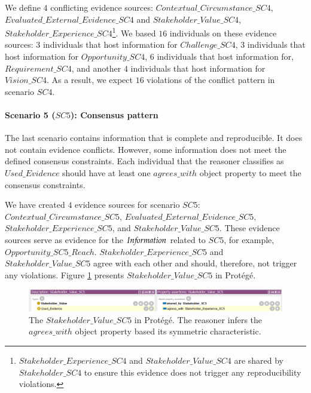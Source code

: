 We define $4$ conflicting evidence sources: $Contextual\_Circumstance\_SC4$, $Evaluated\_External\_Evidence\_SC4$ and $Stakeholder\_Value\_SC4$, $Stakeholder\_Experience\_SC4$\footnote{$Stakeholder\_Experience\_SC4$ and $Stakeholder\_Value\_SC4$ are shared by $Stakeholder\_SC4$ to ensure this evidence does not trigger any reproducibility violations.}. We based $16$ individuals on these evidence sources: $3$ individuals that host information for $Challenge\_SC4$, $3$ individuals that host information for $Opportunity\_SC4$, $6$ individuals that host information for, $Requirement\_SC4$, and another $4$ individuals that host information for $Vision\_SC4$. As a result, we expect $16$ violations of the conflict pattern in scenario $SC4$.

\paragraph{Scenario 5 ($SC5$): Consensus pattern}
The last scenario contains information that is complete and reproducible. It does not contain evidence conflicts. However, some information does not meet the defined consensus constraints. Each individual that the reasoner classifies as $Used\_Evidence$ should have at least one $agrees\_with$ object property to meet the consensus constraints. 

We have created $4$ evidence sources for scenario $SC5$: $Contextual\_Circumstance\_SC5$, $Evaluated\_External\_Evidence\_SC5$, $Stakeholder\_Experience\_SC5$, and $Stakeholder\_Value\_SC5$. These evidence sources serve as evidence for the $In{\mkern-2mu f\mkern-3mu}ormation$ related to $SC5$, for example, $Opportunity\_SC5\_Reach$. $Stakeholder\_Experience\_SC5$ and $Stakeholder\_Value\_SC5$ agree with each other and should, therefore, not trigger any violations. Figure \ref{fig:05_RP_SC5_Stakeholder_Value_SC5} presents $Stakeholder\_Value\_SC5$ in Prot\'eg\'e.

\begin{figure}[H]
\centering
  \includegraphics[width=17cm]{../../Images/05_Validation/05_RP_SC5_Stakeholder_Value_SC5.png}
  \caption{The $Stakeholder\_Value\_SC5$ in Prot\'eg\'e. The reasoner infers the $agrees\_with$ object property based its symmetric characteristic.}
  \label{fig:05_RP_SC5_Stakeholder_Value_SC5}
\end{figure}

